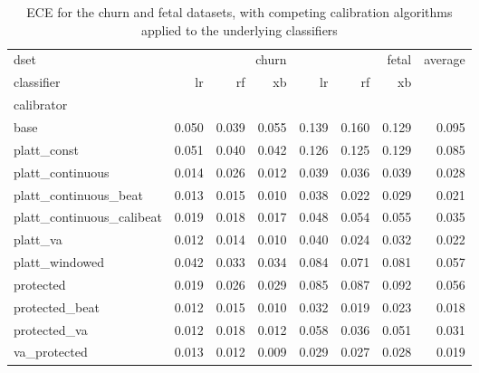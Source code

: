 \begin{table}
\caption{ECE for the churn and fetal datasets, with competing calibration algorithms applied to the underlying classifiers}
\begin{tabular}{l|rrr|rrr|r|}
dset & \multicolumn{3}{r}{churn} & \multicolumn{3}{r}{fetal} & average \\
classifier & lr & rf & xb & lr & rf & xb &  \\
calibrator &  &  &  &  &  &  &  \\
base & 0.050 & 0.039 & 0.055 & 0.139 & 0.160 & 0.129 & 0.095 \\
platt_const & 0.051 & 0.040 & 0.042 & 0.126 & 0.125 & 0.129 & 0.085 \\
platt_continuous & 0.014 & 0.026 & 0.012 & 0.039 & 0.036 & 0.039 & 0.028 \\
platt_continuous_beat & 0.013 & 0.015 & 0.010 & 0.038 & 0.022 & 0.029 & 0.021 \\
platt_continuous_calibeat & 0.019 & 0.018 & 0.017 & 0.048 & 0.054 & 0.055 & 0.035 \\
platt_va & 0.012 & 0.014 & 0.010 & 0.040 & 0.024 & 0.032 & 0.022 \\
platt_windowed & 0.042 & 0.033 & 0.034 & 0.084 & 0.071 & 0.081 & 0.057 \\
protected & 0.019 & 0.026 & 0.029 & 0.085 & 0.087 & 0.092 & 0.056 \\
protected_beat & 0.012 & 0.015 & 0.010 & 0.032 & 0.019 & 0.023 & 0.018 \\
protected_va & 0.012 & 0.018 & 0.012 & 0.058 & 0.036 & 0.051 & 0.031 \\
va_protected & 0.013 & 0.012 & 0.009 & 0.029 & 0.027 & 0.028 & 0.019 \\
\end{tabular}
\end{table}
